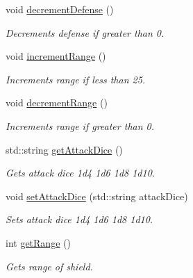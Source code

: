 \begin{DoxyCompactItemize}
\hypertarget{class_shield_a90fe2bbca5c029c88715490c5525e1a6}{}\label{class_shield_a90fe2bbca5c029c88715490c5525e1a6} 
void \hyperlink{class_shield_a90fe2bbca5c029c88715490c5525e1a6}{decrement\+Defense} ()
\begin{DoxyCompactList}\small\item\em Decrements defense if greater than 0. \end{DoxyCompactList}\item 
\hypertarget{class_shield_a2e36b34d593ce4de9066c206c3528846}{}\label{class_shield_a2e36b34d593ce4de9066c206c3528846} 
void \hyperlink{class_shield_a2e36b34d593ce4de9066c206c3528846}{increment\+Range} ()
\begin{DoxyCompactList}\small\item\em Increments range if less than 25. \end{DoxyCompactList}\item 
\hypertarget{class_shield_afeb7f31a542d80ededa37980f13df576}{}\label{class_shield_afeb7f31a542d80ededa37980f13df576} 
void \hyperlink{class_shield_afeb7f31a542d80ededa37980f13df576}{decrement\+Range} ()
\begin{DoxyCompactList}\small\item\em Increments range if greater than 0. \end{DoxyCompactList}\item 
\hypertarget{class_shield_adca98dd6afb94104adbdadde591ae1e2}{}\label{class_shield_adca98dd6afb94104adbdadde591ae1e2} 
std\+::string \hyperlink{class_shield_adca98dd6afb94104adbdadde591ae1e2}{get\+Attack\+Dice} ()
\begin{DoxyCompactList}\small\item\em Gets attack dice 1d4 1d6 1d8 1d10. \end{DoxyCompactList}\item 
\hypertarget{class_shield_a69ddf60fb2bfe723051f535b8f1f5cd6}{}\label{class_shield_a69ddf60fb2bfe723051f535b8f1f5cd6} 
void \hyperlink{class_shield_a69ddf60fb2bfe723051f535b8f1f5cd6}{set\+Attack\+Dice} (std\+::string attack\+Dice)
\begin{DoxyCompactList}\small\item\em Sets attack dice 1d4 1d6 1d8 1d10. \end{DoxyCompactList}\item 
\hypertarget{class_shield_af8b6fccff0ddb7851440da08b4c76c8f}{}\label{class_shield_af8b6fccff0ddb7851440da08b4c76c8f} 
int \hyperlink{class_shield_af8b6fccff0ddb7851440da08b4c76c8f}{get\+Range} ()
\begin{DoxyCompactList}\small\item\em Gets range of shield. \end{DoxyCompactList}\item 

\end{DoxyCompactItemize}
